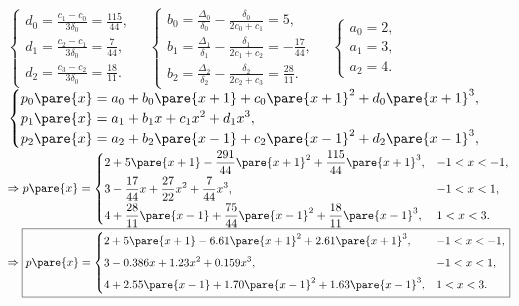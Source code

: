 \documentclass[hidelinks]{ctexart}
\begin{document}
$\displaystyle \begin{cases}
    \displaystyle d_0 = \frac{c_1-c_0}{3\delta_0} = \frac{115}{44}, \\
    \displaystyle d_1 = \frac{c_2-c_1}{3\delta_0} = \frac{7}{44}, \\
    \displaystyle d_2 = \frac{c_3-c_2}{3\delta_0} = \frac{18}{11}.
\end{cases} \quad \begin{cases}
    \displaystyle b_0 = \frac{\Delta_0}{\delta_0} - \frac{\delta_0}{2c_0 + c_1} = 5, \\
    \displaystyle b_1 = \frac{\Delta_1}{\delta_1} - \frac{\delta_1}{2c_1 + c_2} = -\frac{17}{44}, \\
    \displaystyle b_2 = \frac{\Delta_2}{\delta_2} - \frac{\delta_2}{2c_2 + c_3} = \frac{28}{11}.
\end{cases} \quad \begin{cases}
    \displaystyle a_0 = 2, \\
    \displaystyle a_1 = 3, \\
    \displaystyle a_2 = 4.
\end{cases}$ \\
$\begin{cases}
    \displaystyle p_0\pare{x} = a_0 + b_0\pare{x+1} + c_0\pare{x+1}^2 + d_0\pare{x+1}^3, \\
    \displaystyle p_1\pare{x} = a_1 + b_1x + c_1x^2 + d_1x^3, \\
    \displaystyle p_2\pare{x} = a_2 + b_2\pare{x-1} + c_2\pare{x-1}^2 + d_2\pare{x-1}^3,
\end{cases}$\\
$\Rightarrow p\pare{x} = \begin{cases}
    \displaystyle 2+5\pare{x+1} - \frac{291}{44}\pare{x+1}^2 + \frac{115}{44}\pare{x+1}^3, & -1<x<-1, \\[0.5em]
    \displaystyle 3 - \frac{17}{44}x + \frac{27}{22}x^2 + \frac{7}{44}x^3, & -1<x<1,\\[0.5em]
    \displaystyle 4 + \frac{28}{11}\pare{x-1} + \frac{75}{44}\pare{x-1}^2 + \frac{18}{11}\pare{x-1}^3, & 1<x<3.
\end{cases}$ \\
$\Rightarrow \boxed{p\pare{x} = \begin{cases}
    \displaystyle 2+5\pare{x+1} - 6.61\pare{x+1}^2 + 2.61\pare{x+1}^3, & -1<x<-1, \\[0.5em]
    \displaystyle 3 - 0.386x + 1.23x^2 + 0.159x^3, & -1<x<1,\\[0.5em]
    \displaystyle 4 + 2.55\pare{x-1} + 1.70\pare{x-1}^2 + 1.63\pare{x-1}^3, & 1<x<3.
\end{cases}}$\\
\end{document}
